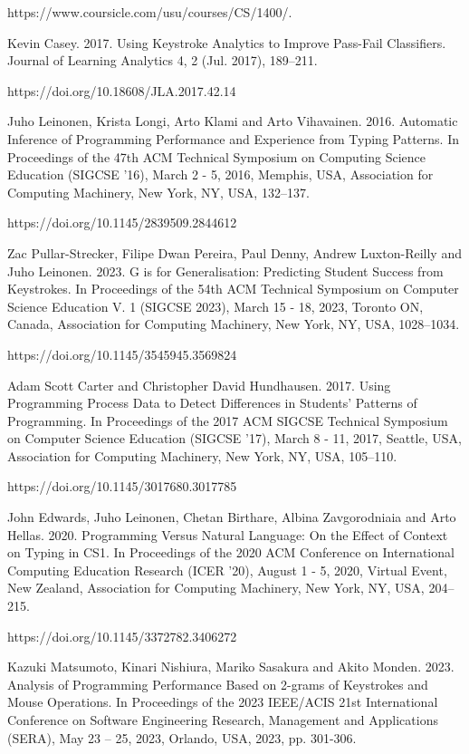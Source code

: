 \documentclass[sigconf,final]{acmart}
\begin{document}
\begin{thebibliography}{99}
{https://www.coursicle.com/usu/courses/CS/1400/.}

Kevin Casey. 2017. Using Keystroke Analytics to Improve Pass-Fail Classifiers. Journal of Learning Analytics 4, 2 (Jul. 2017), 189–211. 

{https://doi.org/10.18608/JLA.2017.42.14}

Juho Leinonen, Krista Longi, Arto Klami and Arto Vihavainen. 2016. Automatic Inference of Programming Performance and Experience from Typing Patterns. In Proceedings of the 47th ACM Technical Symposium on Computing Science Education (SIGCSE '16), March 2 - 5, 2016, Memphis, USA, Association for Computing Machinery, New York, NY, USA, 132–137. 

{https://doi.org/10.1145/2839509.2844612}

Zac Pullar-Strecker, Filipe Dwan Pereira, Paul Denny, Andrew Luxton-Reilly and Juho Leinonen. 2023. G is for Generalisation: Predicting Student Success from Keystrokes. In Proceedings of the 54th ACM Technical Symposium on Computer Science Education V. 1 (SIGCSE 2023), March 15 - 18, 2023, Toronto ON, Canada, Association for Computing Machinery, New York, NY, USA, 1028–1034.

{ https://doi.org/10.1145/3545945.3569824}

 Adam Scott Carter and Christopher David Hundhausen. 2017. Using Programming Process Data to Detect Differences in Students' Patterns of Programming. In Proceedings of the 2017 ACM SIGCSE Technical Symposium on Computer Science Education (SIGCSE '17), March 8 - 11, 2017, Seattle, USA, Association for Computing Machinery, New York, NY, USA, 105–110. 

{https://doi.org/10.1145/3017680.3017785}

John Edwards, Juho Leinonen, Chetan Birthare, Albina Zavgorodniaia and Arto Hellas. 2020. Programming Versus Natural Language: On the Effect of Context on Typing in CS1. In Proceedings of the 2020 ACM Conference on International Computing Education Research (ICER '20), August 1 - 5, 2020, Virtual Event, New Zealand, Association for Computing Machinery, New York, NY, USA, 204–215.

{https://doi.org/10.1145/3372782.3406272}

Kazuki Matsumoto, Kinari Nishiura, Mariko Sasakura and Akito Monden. 2023. Analysis of Programming Performance Based on 2-grams of Keystrokes and Mouse Operations. In Proceedings of the 2023 IEEE/ACIS 21st International Conference on Software Engineering Research, Management and Applications (SERA), May 23 – 25, 2023, Orlando, USA, 2023, pp. 301-306. 


\end{thebibliography}
\end{document}
